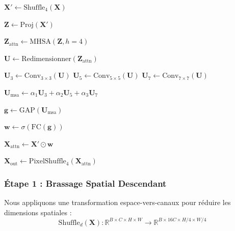 \documentclass[conference]{IEEEtran}
\begin{document}
\begin{algorithm}[!h]
\caption{Descripteur Transformeur Mosaïque (MTD) avec Brassage 4$\times$4 + MHSA + Agrégation Multi-Échelle}

$\mathbf{X}' \leftarrow \text{Shuffle}_{4}(\mathbf{X})$

$\mathbf{Z} \leftarrow \text{Proj}(\mathbf{X}')$

$\mathbf{Z}_{\text{attn}} \leftarrow \text{MHSA}(\mathbf{Z}, h=4)$

$\mathbf{U} \leftarrow \text{Redimensionner}(\mathbf{Z}_{\text{attn}})$

$\mathbf{U}_3 \leftarrow \text{Conv}_{3\times 3}(\mathbf{U})$\;
$\mathbf{U}_5 \leftarrow \text{Conv}_{5\times 5}(\mathbf{U})$\;
$\mathbf{U}_7 \leftarrow \text{Conv}_{7\times 7}(\mathbf{U})$\;

$\mathbf{U}_{\text{msa}} \leftarrow \alpha_1\mathbf{U}_3 + \alpha_2\mathbf{U}_5 + \alpha_3\mathbf{U}_7$

$\mathbf{g} \leftarrow \text{GAP}(\mathbf{U}_{\text{msa}})$

$\mathbf{w} \leftarrow \sigma(\text{FC}(\mathbf{g}))$

$\mathbf{X}_{\text{attn}} \leftarrow \mathbf{X}' \odot \mathbf{w}$\;

$\mathbf{X}_{\text{out}} \leftarrow \text{PixelShuffle}_{4}(\mathbf{X}_{\text{attn}})$

\;
\end{algorithm}
\subsubsection{Étape 1 : Brassage Spatial Descendant}

Nous appliquons une transformation espace-vers-canaux pour réduire les dimensions spatiales :
\begin{equation}
\text{Shuffle}_d(\mathbf{X}) : \mathbb{R}^{B \times C \times H \times W} \rightarrow \mathbb{R}^{B \times 16C \times H/4 \times W/4}
\end{equation}
\end{document}
